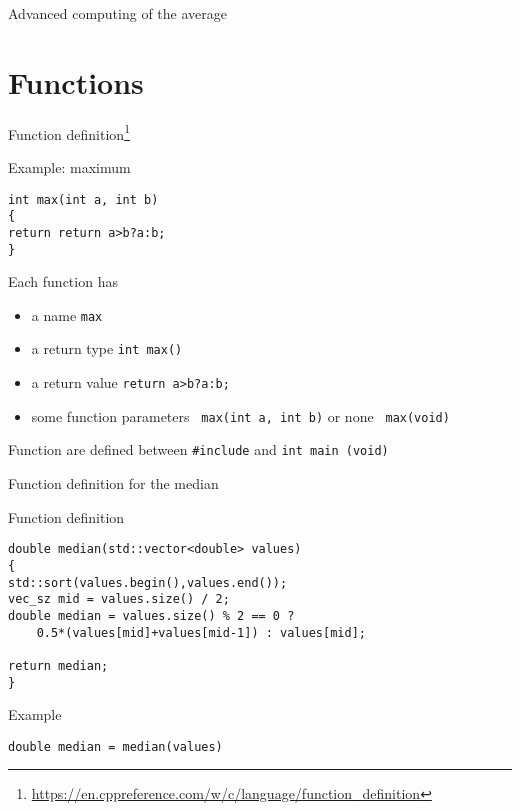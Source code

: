 \documentclass[\classoption]{beamer}
\begin{document}
\begin{frame}{Advanced computing of the average}



\end{frame}

\section{Functions}

\begin{frame}[fragile]{Function definition\footnote{\tiny\url{https://en.cppreference.com/w/c/language/function_definition}}}

\begin{block}{Example: maximum}
\begin{lstlisting}
int max(int a, int b)
{
return return a>b?a:b;
}

\end{lstlisting}
\end{block}
\begin{block}{Each function has}
\begin{itemize}
\item a name \lstinline|max|
\item a return type \lstinline|int max()|
\item a return value \lstinline|return a>b?a:b;|
\item some function parameters \lstinline| max(int a, int b)| or none \lstinline| max(void) |
\end{itemize}
\end{block}
Function are defined between \lstinline|#include| and \lstinline|int main (void)|
\end{frame}

\begin{frame}[fragile]{Function definition for the median}

\begin{block}{Function definition}
\begin{lstlisting}
double median(std::vector<double> values)
{
std::sort(values.begin(),values.end());
vec_sz mid = values.size() / 2;
double median = values.size() % 2 == 0 ? 
    0.5*(values[mid]+values[mid-1]) : values[mid];
    
return median;
}
\end{lstlisting}
\end{block}

\begin{block}{Example}

\lstinline|double median = median(values)|

\end{block}

\end{frame}
\end{document}
